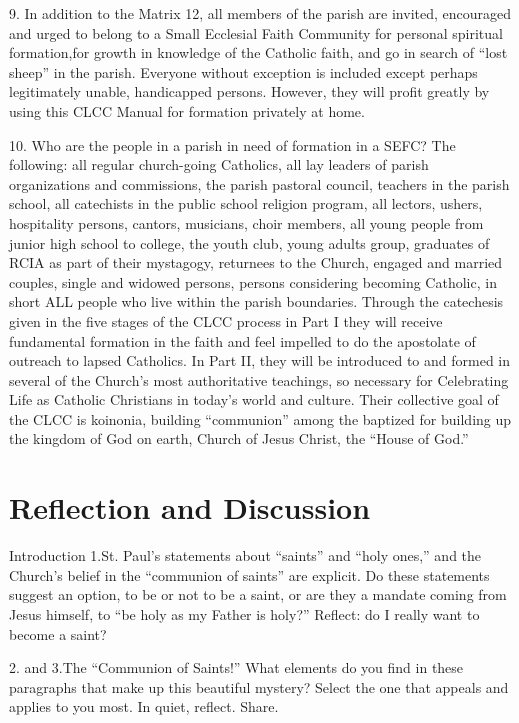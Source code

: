 \documentclass[oneside]{book}
\begin{document}
9. In addition to the Matrix 12, all members of the parish are invited,
encouraged and urged to belong to a Small Ecclesial Faith Community for personal
spiritual formation,for growth in knowledge of the Catholic faith, and go in
search of ``lost sheep'' in the parish. Everyone without exception is included
except perhaps legitimately unable, handicapped persons. However, they will
profit greatly by using this CLCC Manual for formation privately at home.

10. Who are the people in a parish in need of formation in a SEFC? The
following: all regular church-going Catholics, all lay leaders of parish
organizations and commissions, the parish pastoral council, teachers in the
parish school, all catechists in the public school religion program, all
lectors, ushers, hospitality persons, cantors, musicians, choir members, all
young people from junior high school to college, the youth club, young adults
group, graduates of RCIA as part of their mystagogy, returnees to the Church,
engaged and married couples, single and widowed persons, persons considering
becoming Catholic, in short ALL people who live within the parish boundaries.
Through the catechesis given in the five stages of the CLCC process in Part I
they will receive fundamental formation in the faith and feel impelled to do the
apostolate of outreach to lapsed Catholics. In Part II, they will be introduced
to and formed in several of the Church's most authoritative teachings, so
necessary for Celebrating Life as Catholic Christians in today's world and
culture. Their collective goal of the CLCC is koinonia, building ``communion''
among the baptized for building up the kingdom of God on earth, Church of Jesus
Christ, the ``House of God.''


\section{Reflection and Discussion}

Introduction
1.St. Paul's statements about ``saints'' and ``holy ones,'' and the Church's
belief in the ``communion of saints'' are explicit. Do these statements suggest
an option, to be or not to be a saint, or are they a mandate coming from Jesus
himself, to ``be holy as my Father is holy?'' Reflect: do I really want to
become a saint?

2. and 3.The ``Communion of Saints!'' What elements do you find in these
paragraphs that make up this beautiful mystery? Select the one that appeals and
applies to you most. In quiet, reflect. Share.
\end{document}
